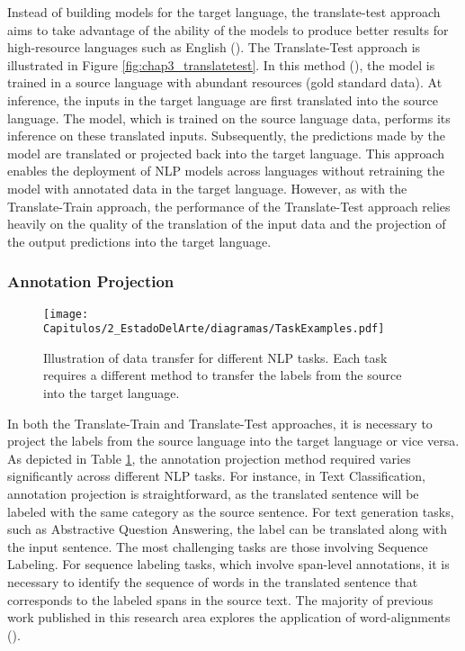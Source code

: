 Instead of building models for the target language, the translate-test approach aims to take advantage of the ability of the models to produce better results for high-resource languages such as English (\cite{etxaniz-etal-2024-multilingual}). The Translate-Test approach is illustrated in Figure \ref{fig:chap3_translatetest}. In this method (\cite{shah2010synergy,10.1007/978-3-540-45175-4_13,tebbifakhr-etal-2020-machine}), the model is trained in a source language with abundant resources (gold standard data). At inference, the inputs in the target language are first translated into the source language. The model, which is trained on the source language data, performs its inference on these translated inputs. Subsequently, the predictions made by the model are translated or projected back into the target language. This approach enables the deployment of NLP models across languages without retraining the model with annotated data in the target language. However, as with the Translate-Train approach, the performance of the Translate-Test approach relies heavily on the quality of the translation of the input data and the projection of the output predictions into the target language. 

\subsubsection{Annotation Projection}

\begin{figure}
    \centering
    \texttt{[image: Capitulos/2\_EstadoDelArte/diagramas/TaskExamples.pdf]}
    \caption{Illustration of data transfer for different NLP tasks. Each task requires a different method to transfer the labels from the source into the target language.}
    \label{fig:chap3_taskexamples}
\end{figure}



In both the Translate-Train and Translate-Test approaches, it is necessary to project the labels from the source language into the target language or vice versa. As depicted in Table \ref{fig:chap3_taskexamples}, the annotation projection method required varies significantly across different NLP tasks. For instance, in Text Classification, annotation projection is straightforward, as the translated sentence will be labeled with the same category as the source sentence. For text generation tasks, such as Abstractive Question Answering, the label can be translated along with the input sentence. The most challenging tasks are those involving Sequence Labeling. For sequence labeling tasks, which involve span-level annotations, it is necessary to identify the sequence of words in the translated sentence that corresponds to the labeled spans in the source text. The majority of previous work published in this research area explores the application of word-alignments (\cite{Ehrmann}). 


